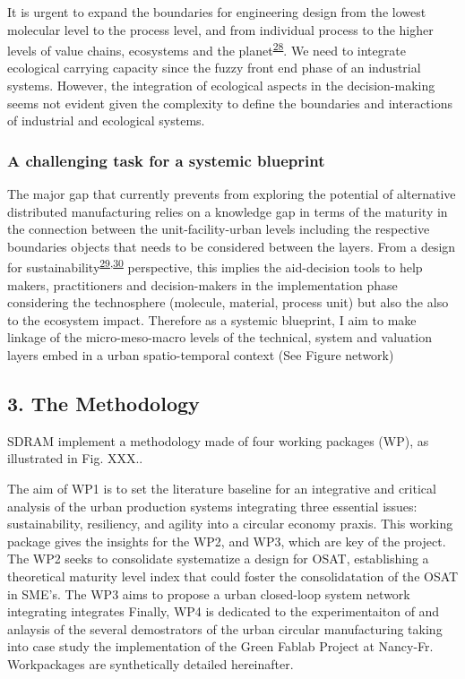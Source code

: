 \documentclass[
  11pt,
  a4paperpaper,
  onecolumn]{article}
\begin{document}
It is urgent to expand the boundaries for engineering design from the
lowest molecular level to the process level, and from individual process
to the higher levels of value chains, ecosystems and the
planet\textsuperscript{\protect\hyperlink{ref-Martinez-Hernandez2017}{28}}.
We need to integrate ecological carrying capacity since the fuzzy front
end phase of an industrial systems. However, the integration of
ecological aspects in the decision-making seems not evident given the
complexity to define the boundaries and interactions of industrial and
ecological systems.

\hypertarget{a-challenging-task-for-a-systemic-blueprint}{%
\subsubsection{A challenging task for a systemic
blueprint}\label{a-challenging-task-for-a-systemic-blueprint}}

The major gap that currently prevents from exploring the potential of
alternative distributed manufacturing relies on a knowledge gap in terms
of the maturity in the connection between the unit-facility-urban levels
including the respective boundaries objects that needs to be considered
between the layers. From a design for
sustainability\textsuperscript{\protect\hyperlink{ref-Ceschin2016}{29},\protect\hyperlink{ref-SousaRocha2019}{30}}
perspective, this implies the aid-decision tools to help makers,
practitioners and decision-makers in the implementation phase
considering the technosphere (molecule, material, process unit) but also
the also to the ecosystem impact. Therefore as a systemic blueprint, I
aim to make linkage of the micro-meso-macro levels of the technical,
system and valuation layers embed in a urban spatio-temporal context
(See Figure network)

\hypertarget{the-methodology}{%
\subsection{3. The Methodology}\label{the-methodology}}

SDRAM implement a methodology made of four working packages (WP), as
illustrated in Fig. XXX..

The aim of WP1 is to set the literature baseline for an integrative and
critical analysis of the urban production systems integrating three
essential issues: sustainability, resiliency, and agility into a
circular economy praxis. This working package gives the insights for the
WP2, and WP3, which are key of the project. The WP2 seeks to consolidate
systematize a design for OSAT, establishing a theoretical maturity level
index that could foster the consolidatation of the OSAT in SME's. The
WP3 aims to propose a urban closed-loop system network integrating
integrates Finally, WP4 is dedicated to the experimentaiton of and
anlaysis of the several demostrators of the urban circular manufacturing
taking into case study the implementation of the Green Fablab Project at
Nancy-Fr. Workpackages are synthetically detailed hereinafter.
\end{document}
